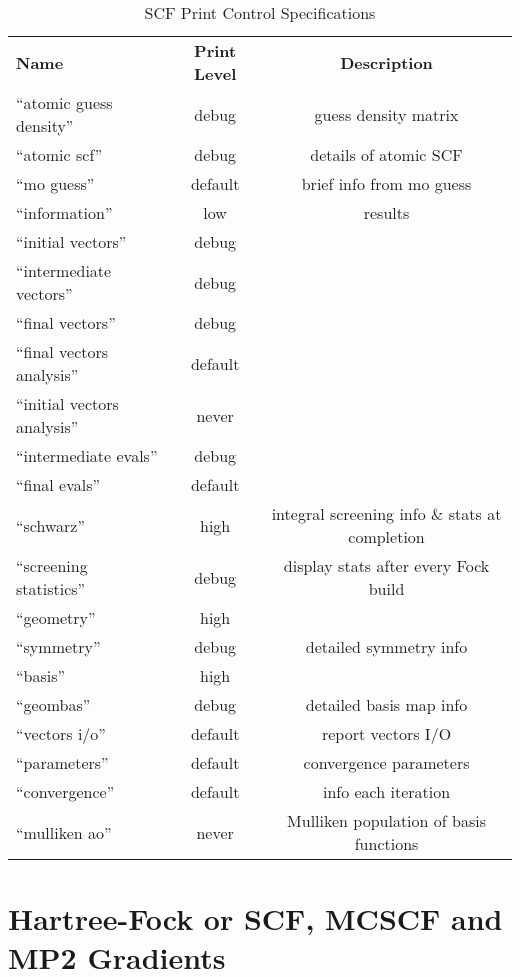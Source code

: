 \begin{table}[htbp]
\begin{center}
\begin{tabular}{lcc}
  {\bf Name}          & {\bf Print Level} & {\bf Description} \\
 ``atomic guess density''     & debug     & guess density matrix \\
 ``atomic scf''               & debug     & details of atomic SCF \\
 ``mo guess''                 & default   & brief info from mo guess \\
 ``information''              & low       & results  \\
 ``initial vectors''          & debug     & \\
 ``intermediate vectors''     & debug     & \\
 ``final vectors''            & debug     & \\
 ``final vectors analysis''   & default   & \\
 ``initial vectors analysis'' & never     & \\
 ``intermediate evals''       & debug     & \\
 ``final evals''              & default   & \\
 ``schwarz''                  & high      & integral screening info \& stats at completion\\
 ``screening statistics''     & debug     & display stats after every Fock build \\
 ``geometry''                 & high      & \\
 ``symmetry''                 & debug     & detailed symmetry info \\
 ``basis''                    & high      & \\
 ``geombas''                  & debug     & detailed basis map info \\
 ``vectors i/o''              & default   & report vectors I/O \\
 ``parameters''               & default   & convergence parameters \\
 ``convergence''              & default   & info each iteration \\
 ``mulliken ao''              & never     & Mulliken population of basis functions
\end{tabular}
\end{center}
\caption{SCF Print Control Specifications}
\end{table}

\newpage
\section{Hartree-Fock or SCF, MCSCF and MP2 Gradients}



